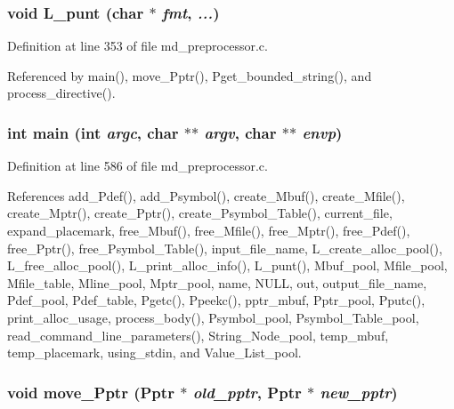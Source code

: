 \subsubsection{\setlength{\rightskip}{0pt plus 5cm}void L\_\-punt (char $\ast$ {\em fmt},  {\em ...})}\label{md__preprocessor_8c_c8ccfa451c1bd1740a1b720ba5b4c3a9}




Definition at line 353 of file md\_\-preprocessor.c.

Referenced by main(), move\_\-Pptr(), Pget\_\-bounded\_\-string(), and process\_\-directive().
\subsubsection{\setlength{\rightskip}{0pt plus 5cm}int main (int {\em argc}, char $\ast$$\ast$ {\em argv}, char $\ast$$\ast$ {\em envp})}\label{md__preprocessor_8c_647f21a28344e1d9c643f4115516d7c9}




Definition at line 586 of file md\_\-preprocessor.c.

References add\_\-Pdef(), add\_\-Psymbol(), create\_\-Mbuf(), create\_\-Mfile(), create\_\-Mptr(), create\_\-Pptr(), create\_\-Psymbol\_\-Table(), current\_\-file, expand\_\-placemark, free\_\-Mbuf(), free\_\-Mfile(), free\_\-Mptr(), free\_\-Pdef(), free\_\-Pptr(), free\_\-Psymbol\_\-Table(), input\_\-file\_\-name, L\_\-create\_\-alloc\_\-pool(), L\_\-free\_\-alloc\_\-pool(), L\_\-print\_\-alloc\_\-info(), L\_\-punt(), Mbuf\_\-pool, Mfile\_\-pool, Mfile\_\-table, Mline\_\-pool, Mptr\_\-pool, name, NULL, out, output\_\-file\_\-name, Pdef\_\-pool, Pdef\_\-table, Pgetc(), Ppeekc(), pptr\_\-mbuf, Pptr\_\-pool, Pputc(), print\_\-alloc\_\-usage, process\_\-body(), Psymbol\_\-pool, Psymbol\_\-Table\_\-pool, read\_\-command\_\-line\_\-parameters(), String\_\-Node\_\-pool, temp\_\-mbuf, temp\_\-placemark, using\_\-stdin, and Value\_\-List\_\-pool.
\subsubsection{\setlength{\rightskip}{0pt plus 5cm}void move\_\-Pptr (\bf{Pptr} $\ast$ {\em old\_\-pptr}, \bf{Pptr} $\ast$ {\em new\_\-pptr})}\label{md__preprocessor_8c_657cab1ededb1d24f0f14f022bcd094d}




